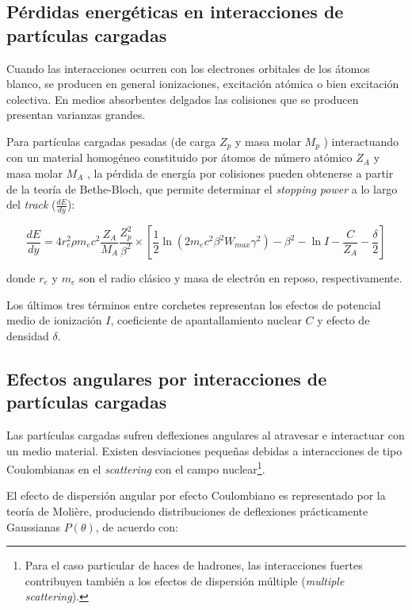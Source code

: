 \subsection{P\'erdidas energ\'eticas en interacciones de part\'iculas cargadas}

Cuando las interacciones ocurren con los electrones orbitales de los átomos blanco, se producen en general ionizaciones, excitación atómica o bien excitación colectiva. En medios absorbentes delgados las colisiones que se producen presentan varianzas grandes.

Para partículas cargadas pesadas (de carga $Z_{p}$ y masa molar $M_{p}$ ) interactuando con un material homogéneo constituido por átomos de número atómico $Z_{A}$ y masa molar $M_{A}$ , la pérdida de energía por colisiones pueden obtenerse a partir de la teoría de Bethe-Bloch, que permite determinar el \emph{stopping power} a lo largo del \emph{track} ($\frac{dE}{dy}$):

\begin{equation}
 \frac{dE}{dy} = 4 r^{2}_{e} \rho m_{e} c^{2} \frac{Z_{A}}{M_{A}} \frac{Z_{p}^{2}}{\beta^{2}} \times 
		\left[
		\frac{1}{2} \ln{\left(
				2 m_{e} c^{2} \beta^{2} W_{max} \gamma^{2}
				\right)}
			    - \beta^{2} - \ln{I} - \frac{C}{Z_{A}} - \frac{\delta}{2}
		\right]
\end{equation}

\noindent
donde $r_e$ y $m_e$ son el radio clásico y masa de electrón en reposo, respectivamente.

Los últimos tres términos entre corchetes representan los efectos de potencial medio de ionización $I$, coeficiente de apantallamiento nuclear $C$ y efecto de densidad $\delta$.

\subsection{Efectos angulares por interacciones de part\'iculas cargadas}

Las partículas cargadas sufren deflexiones angulares al atravesar e interactuar con un medio material. Existen desviaciones pequeñas debidas a interacciones de tipo Coulombianas en el \emph{scattering} con el campo nuclear\footnote{Para el caso particular de haces de hadrones, las interacciones fuertes contribuyen también a los efectos de
dispersión múltiple (\emph{multiple scattering}).}.

El efecto de dispersión angular por efecto Coulombiano es representado por la teoría de Molière, produciendo distribuciones de deflexiones prácticamente Gaussianas $P(\theta)$, de acuerdo con:

